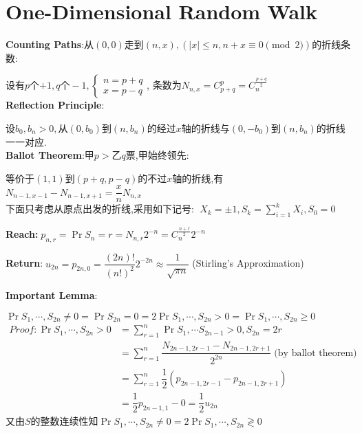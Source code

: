 
\section{One-Dimensional Random Walk}
\textbf{Counting Paths}:从$ (0,0)走到 (n,x),(|x|\le n, n + x\equiv 0 \pmod 2)$的折线条数:

  设有$ p$个$ +1,q个-1,\begin{cases}n=p+q\\x=p-q \end{cases}$,
  条数为$ N_{n,x} = C_{p+q}^p = C_{n}^{\frac{p+q}{2}}$
  \\

  \textbf{Reflection Principle}:

  设$ b_0,b_n>0,从(0,b_0)到(n,b_n)$的经过$ x$轴的折线与$(0,-b_0)$到$(n,b_n)$的折线一一对应.
  \\

  \textbf{Ballot Theorem}:甲$ p>$乙$ q$票,甲始终领先:

  等价于$ (1,1)$到$ (p+q,p-q)$的不过$ x$轴的折线,有$ N_{n-1,x-1} -
  N_{n-1,x+1}=\dfrac{x}{n}N_{n,x}$
  \\

  下面只考虑从原点出发的折线,采用如下记号:
  $\; X_k = \pm 1, S_k = \sum_{i=1}^k{X_i},S_0=0$

  \textbf{Reach:}$\; p_{n,r} = \Pr{S_n=r} = N_{n,r}2^{-n} = C_{n}^{\frac{n+r}{2}}2^{-n}$

  \textbf{Return}:$\; u_{2n} = p_{2n,0} = \dfrac{(2n)!}{(n!)^2}2^{-2n}\approx \dfrac{1}{\sqrt{\pi n}}$ (Stirling's Approximation)
  \vspace{0.6cm}

  \textbf{Important Lemma}:

  $ \Pr{S_1,\cdots ,S_{2n}\neq 0} = \Pr{S_{2n}=0}=2\Pr{S_1,\cdots ,S_{2n}>0} =
    \Pr{S_1,\cdots ,S_{2n}\ge 0}$
\begin{align*}
  \textit{Proof}:
   \Pr{S_1,\cdots ,S_{2n}>0} &= \sum_{r=1}^{n}{\Pr{S_1 ,\cdots S_{2n-1}>0,S_{2n}=2r}}\\
   &=\sum_{r=1}^{n}{\dfrac{N_{2n-1,2r-1}-N_{2n-1,2r+1}}{2^{2n}}} \; \text{(by ballot theorem)}\\
   &=\sum_{r=1}^n{\dfrac{1}{2}(p_{2n-1,2r-1}-p_{2n-1,2r+1})} \\
   &=\dfrac{1}{2}p_{2n-1,1}-0 = \dfrac{1}{2}u_{2n}
\end{align*}
又由$ S$的整数连续性知$ \Pr{S_1,\cdots ,S_{2n}\neq0}=2\Pr{S_1,\cdots ,S_{2n}\gtrless 0}$

